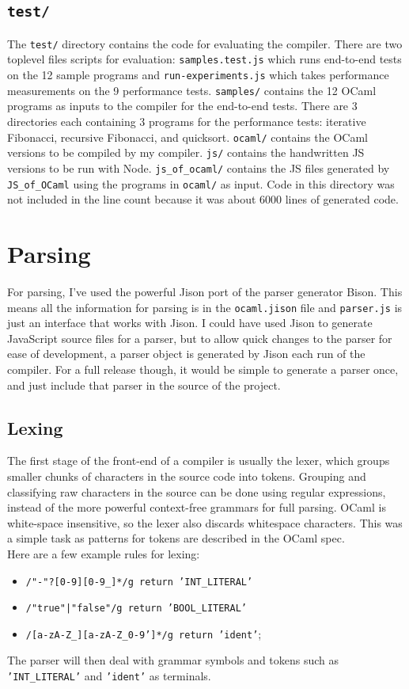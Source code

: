 \documentclass[12pt,a4paper,twoside,openright]{report}
\newcommand{\JSofOCaml}{{\tt JS\_of\_OCaml} }
\begin{document}
\subsection*{{\tt test/}}
The {\tt test/} directory contains the code for evaluating the compiler.
There are two toplevel files scripts for evaluation: {\tt samples.test.js} which runs end-to-end tests on the 12 sample programs and {\tt run-experiments.js} which takes performance measurements on the 9 performance tests.
{\tt samples/} contains the 12 OCaml programs as inputs to the compiler for the end-to-end tests.
There are 3 directories each containing 3 programs for the performance tests: iterative Fibonacci, recursive Fibonacci, and quicksort.
{\tt ocaml/} contains the OCaml versions to be compiled by my compiler.
{\tt js/} contains the handwritten JS versions to be run with Node.
{\tt js\_of\_ocaml/} contains the JS files generated by \JSofOCaml using the programs in {\tt ocaml/} as input.
Code in this directory was not included in the line count because it was about 6000 lines of generated code.

\section{Parsing}
For parsing, I've used the powerful Jison port of the parser generator Bison.
This means all the information for parsing is in the {\tt ocaml.jison} file and {\tt parser.js} is just an interface that works with Jison.
I could have used Jison to generate JavaScript source files for a parser, but to allow quick changes to the parser for ease of development, a parser object is generated by Jison each run of the compiler.
For a full release though, it would be simple to generate a parser once, and just include that parser in the source of the project.

\subsection{Lexing}
The first stage of the front-end of a compiler is usually the lexer, which groups smaller chunks of characters in the source code into tokens.
Grouping and classifying raw characters in the source can be done using regular expressions, instead of the more powerful context-free grammars for full parsing.
OCaml is white-space insensitive, so the lexer also discards whitespace characters.
This was a simple task as patterns for tokens are described in the OCaml spec. \\
Here are a few example rules for lexing:
\begin{itemize}
   \item {\tt /"-"?[0-9][0-9\_]*/g return 'INT\_LITERAL'}
   \item {\tt /"true"|"false"/g return 'BOOL\_LITERAL'}
   \item {\tt /[a-zA-Z\_][a-zA-Z\_0-9']*/g return 'ident'};
\end{itemize}
The parser will then deal with grammar symbols and tokens such as {\tt 'INT\_LITERAL'} and {\tt 'ident'} as terminals.
\end{document}
